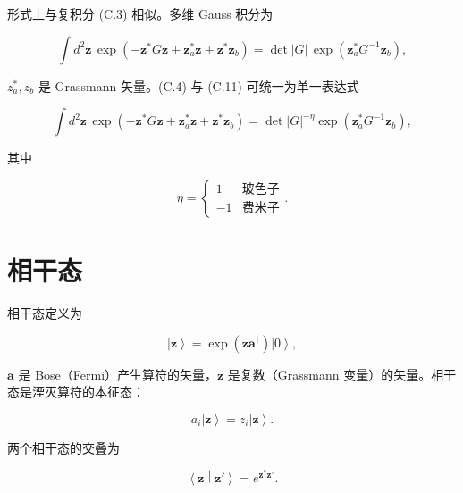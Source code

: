 形式上与复积分 (C.3) 相似。多维 Gauss 积分为

\begin{equation*}
\int d ^ {2} \mathbf {z} \, \exp \left( - \mathbf {z} ^ {*} G \mathbf {z} + \mathbf {z} _ {a} ^ {*} \mathbf {z} + \mathbf {z} ^ {*} \mathbf {z} _ {b} \right) = \det | G | \, \exp \left( \mathbf {z} _ {a} ^ {*} G ^ {- 1} \mathbf {z} _ {b} \right) ,
\tag{C.11}
\end{equation*}

$z_{a}^{*}, z_{b}$ 是 Grassmann 矢量。(C.4) 与 (C.11) 可统一为单一表达式

\begin{equation*}
\int d ^ {2} \mathbf {z} \, \exp \left( - \mathbf {z} ^ {*} G \mathbf {z} + \mathbf {z} _ {a} ^ {*} \mathbf {z} + \mathbf {z} ^ {*} \mathbf {z} _ {b} \right) = \det | G | ^ {- \eta} \exp \left( \mathbf {z} _ {a} ^ {*} G ^ {- 1} \mathbf {z} _ {b} \right) ,
\tag{C.12}
\end{equation*}

其中

\begin{equation*}
\eta = \left\{ \begin{array}{ll} 1 & \text{玻色子} \\ - 1 & \text{费米子} \end{array} \right. .
\tag{C.13}
\end{equation*}

\section{相干态}

相干态定义为

\begin{equation*}
\left| \mathbf {z} \right\rangle = \exp \left( \mathbf {za} ^ {\dagger} \right) \left| 0 \right\rangle ,
\tag{C.14}
\end{equation*}

$\mathbf{a}$ 是 Bose（Fermi）产生算符的矢量，$\mathbf{z}$ 是复数（Grassmann 变量）的矢量。相干态是湮灭算符的本征态：

\begin{equation*}
a _ {i} \left| \mathbf {z} \right\rangle = z _ {i} \left| \mathbf {z} \right\rangle .
\tag{C.15}
\end{equation*}

两个相干态的交叠为

\begin{equation*}
\left\langle \mathbf {z} \middle| \mathbf {z} ' \right\rangle = e ^ {\mathbf {z} ^ {*} \mathbf {z} '}.
\tag{C.16}
\end{equation*}

